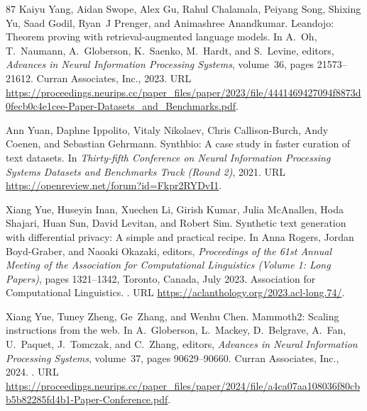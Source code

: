 \begin{thebibliography}{87}
Kaiyu Yang, Aidan Swope, Alex Gu, Rahul Chalamala, Peiyang Song, Shixing Yu, Saad Godil, Ryan~J Prenger, and Animashree Anandkumar.
\newblock Leandojo: Theorem proving with retrieval-augmented language models.
\newblock In A.~Oh, T.~Naumann, A.~Globerson, K.~Saenko, M.~Hardt, and S.~Levine, editors, \emph{Advances in Neural Information Processing Systems}, volume~36, pages 21573--21612. Curran Associates, Inc., 2023.
\newblock URL \url{https://proceedings.neurips.cc/paper_files/paper/2023/file/4441469427094f8873d0fecb0c4e1cee-Paper-Datasets_and_Benchmarks.pdf}.

Ann Yuan, Daphne Ippolito, Vitaly Nikolaev, Chris Callison-Burch, Andy Coenen, and Sebastian Gehrmann.
\newblock Synthbio: A case study in faster curation of text datasets.
\newblock In \emph{Thirty-fifth Conference on Neural Information Processing Systems Datasets and Benchmarks Track (Round 2)}, 2021.
\newblock URL \url{https://openreview.net/forum?id=Fkpr2RYDvI1}.

Xiang Yue, Huseyin Inan, Xuechen Li, Girish Kumar, Julia McAnallen, Hoda Shajari, Huan Sun, David Levitan, and Robert Sim.
\newblock Synthetic text generation with differential privacy: A simple and practical recipe.
\newblock In Anna Rogers, Jordan Boyd-Graber, and Naoaki Okazaki, editors, \emph{Proceedings of the 61st Annual Meeting of the Association for Computational Linguistics (Volume 1: Long Papers)}, pages 1321--1342, Toronto, Canada, July 2023. Association for Computational Linguistics.
\newblock {}.
\newblock URL \url{https://aclanthology.org/2023.acl-long.74/}.

Xiang Yue, Tuney Zheng, Ge~Zhang, and Wenhu Chen.
\newblock Mammoth2: Scaling instructions from the web.
\newblock In A.~Globerson, L.~Mackey, D.~Belgrave, A.~Fan, U.~Paquet, J.~Tomczak, and C.~Zhang, editors, \emph{Advances in Neural Information Processing Systems}, volume~37, pages 90629--90660. Curran Associates, Inc., 2024.
\newblock {}.
\newblock URL \url{https://proceedings.neurips.cc/paper_files/paper/2024/file/a4ca07aa108036f80cbb5b82285fd4b1-Paper-Conference.pdf}.


\end{thebibliography}
